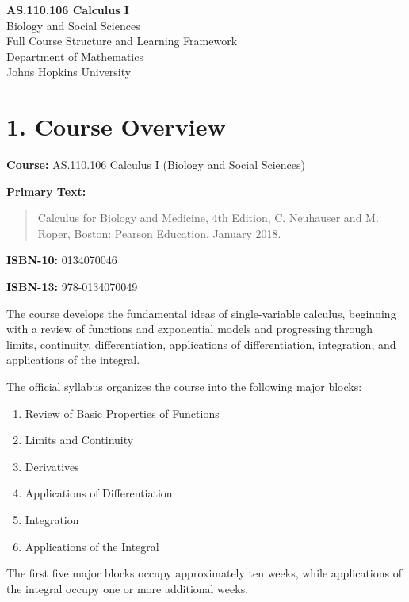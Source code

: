 \documentclass[11pt]{article}
\begin{document}
\begin{center}
    {\LARGE \textbf{AS.110.106 Calculus I}}\\[4pt]
    {\Large Biology and Social Sciences}\\[8pt]
    {\large Full Course Structure and Learning Framework}\\[12pt]
    Department of Mathematics\\
    Johns Hopkins University
\end{center}

\vspace{0.5cm}

\section*{1. Course Overview}

\textbf{Course:} AS.110.106 Calculus I (Biology and Social Sciences)

\textbf{Primary Text:}
\begin{quote}
Calculus for Biology and Medicine, 4th Edition,
C. Neuhauser and M. Roper, Boston: Pearson Education, January 2018.
\end{quote}

\textbf{ISBN-10:} 0134070046

\textbf{ISBN-13:} 978-0134070049

The course develops the fundamental ideas of single-variable calculus, beginning
with a review of functions and exponential models and progressing through limits,
continuity, differentiation, applications of differentiation, integration, and
applications of the integral.

The official syllabus organizes the course into the following major blocks:

\begin{enumerate}
    \item Review of Basic Properties of Functions
    \item Limits and Continuity
    \item Derivatives
    \item Applications of Differentiation
    \item Integration
    \item Applications of the Integral
\end{enumerate}

The first five major blocks occupy approximately ten weeks, while applications
of the integral occupy one or more additional weeks.
\end{document}
